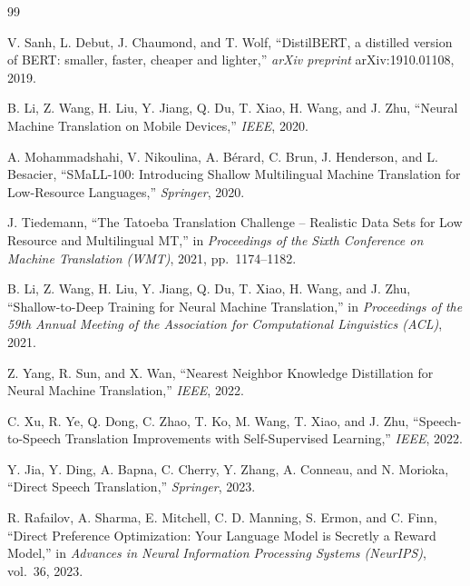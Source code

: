 \clearpage
\renewcommand{\bibname}{\normalfont\fontsize{18}{22}\selectfont\bfseries\hfill REFERENCES\hfill}

{
\begin{thebibliography}{99}
\setlength{\itemsep}{5pt}

V. Sanh, L. Debut, J. Chaumond, and T. Wolf, ``DistilBERT, a distilled version
of BERT: smaller, faster, cheaper and lighter,'' \textit{arXiv preprint}
arXiv:1910.01108, 2019.

B. Li, Z. Wang, H. Liu, Y. Jiang, Q. Du, T. Xiao, H. Wang, and J. Zhu, ``Neural
Machine Translation on Mobile Devices,'' \textit{IEEE}, 2020.

A. Mohammadshahi, V. Nikoulina, A. B\'{e}rard, C. Brun, J. Henderson, and
L. Besacier, ``SMaLL-100: Introducing Shallow Multilingual Machine Translation
for Low-Resource Languages,'' \textit{Springer}, 2020.

J. Tiedemann, ``The Tatoeba Translation Challenge -- Realistic Data Sets for
Low Resource and Multilingual MT,'' in \textit{Proceedings of the Sixth
Conference on Machine Translation (WMT)}, 2021, pp.~1174--1182.

B. Li, Z. Wang, H. Liu, Y. Jiang, Q. Du, T. Xiao, H. Wang, and J. Zhu,
``Shallow-to-Deep Training for Neural Machine Translation,'' in
\textit{Proceedings of the 59th Annual Meeting of the Association for
Computational Linguistics (ACL)}, 2021.

Z. Yang, R. Sun, and X. Wan, ``Nearest Neighbor Knowledge Distillation for
Neural Machine Translation,'' \textit{IEEE}, 2022.

C. Xu, R. Ye, Q. Dong, C. Zhao, T. Ko, M. Wang, T. Xiao, and J. Zhu,
``Speech-to-Speech Translation Improvements with Self-Supervised Learning,''
\textit{IEEE}, 2022.

Y. Jia, Y. Ding, A. Bapna, C. Cherry, Y. Zhang, A. Conneau, and N. Morioka,
``Direct Speech Translation,'' \textit{Springer}, 2023.

R. Rafailov, A. Sharma, E. Mitchell, C. D. Manning, S. Ermon, and C. Finn,
``Direct Preference Optimization: Your Language Model is Secretly a Reward
Model,'' in \textit{Advances in Neural Information Processing Systems
(NeurIPS)}, vol.~36, 2023.


\end{thebibliography}}
